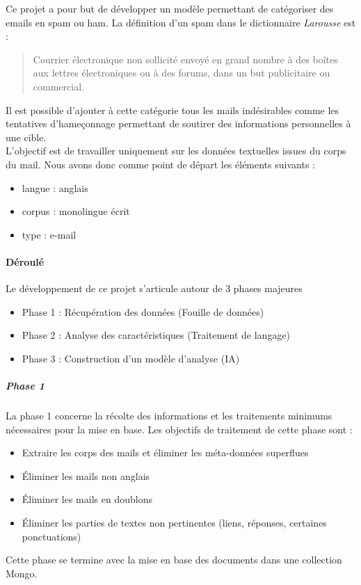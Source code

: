 Ce projet a pour but de développer un modèle permettant de catégoriser des emails en spam ou ham.
La définition d'un spam dans le dictionnaire \emph{Larousse} est :

\begin{quote}
	Courrier électronique non sollicité envoyé en grand nombre à des boîtes aux lettres électroniques ou à des forums, dans un but publicitaire ou commercial.
\end{quote}

Il est possible d'ajouter à cette catégorie tous les mails indésirables comme les tentatives d'hameçonnage permettant de soutirer des informations personnelles à une cible.\\ 

L'objectif est de travailler uniquement sur les données textuelles issues du corps du mail.
Nous avons donc comme point de départ les éléments suivants :
\begin{itemize}
	\item langue : anglais
	\item corpus : monolingue écrit
	\item type : e-mail
\end{itemize}

\paragraph{Déroulé} Le développement de ce projet s'articule autour de 3 phases majeures
	\begin{itemize}
		\item Phase 1 : Récupération des données (Fouille de données)
		\item Phase 2 : Analyse des caractéristiques (Traitement de langage)
		\item Phase 3 : Construction d'un modèle d'analyse (IA)
	\end{itemize}


\subparagraph{Phase 1} La phase 1 concerne la récolte des informations et les traitements minimums nécessaires pour la mise en base.
Les objectifs de traitement de cette phase sont :
\begin{itemize}
	\item Extraire les corps des mails et éliminer les méta-données superflues
	\item Éliminer les mails non anglais
	\item Éliminer les mails en doublons
	\item Éliminer les parties de textes non pertinentes (liens, réponses, certaines ponctuations)
\end{itemize}
Cette phase se termine avec la mise en base des documents dans une collection Mongo.

